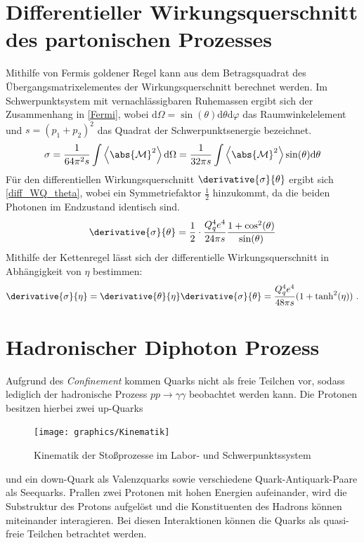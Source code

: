 \section{Differentieller Wirkungsquerschnitt des partonischen Prozesses}
\label{2.2}
Mithilfe von Fermis goldener Regel kann aus dem Betragsquadrat des Übergangsmatrixelementes der Wirkungsquerschnitt berechnet werden.
Im Schwerpunktsystem mit vernachlässigbaren Ruhemassen ergibt sich der Zusammenhang in \textsf{\autoref{Fermi}}, wobei $\text{d}\Omega = \sin(\theta)\text{d}\theta\text{d}\varphi$ das Raumwinkelelement und $s = (p_1 + p_2)^2$ das Quadrat der Schwerpunktsenergie bezeichnet.
\begin{equation}
\sigma = \frac{1}{64\pi^2s} \int \left\langle  \abs{\mathcal{M}}^2\right\rangle \text{d}\Omega = \frac{1}{32\pi s} \int \left\langle  \abs{\mathcal{M}}^2\right\rangle \sin(\theta) \text{d}\theta
\label{Fermi}
\end{equation}
Für den differentiellen Wirkungsquerschnitt $\derivative{\sigma}{\theta}$ ergibt sich \textsf{\autoref{diff_WQ_theta}}, wobei ein Symmetriefaktor $\frac{1}{2}$ hinzukommt, da die beiden Photonen im Endzustand identisch sind.
\begin{equation}
\derivative{\sigma}{\theta} = \frac{1}{2} \cdot \frac{Q_q^4e^4}{24\pi s}\frac{1+\cos^2(\theta)}{\sin(\theta)} 
\label{diff_WQ_theta}
\end{equation}
Mithilfe der Kettenregel lässt sich der differentielle Wirkungsquerschnitt in Abhängigkeit von $\eta$ bestimmen:
\begin{equation}
\derivative{\sigma}{\eta} =\derivative{\theta}{\eta}\derivative{\sigma}{\theta} =  \frac{Q_q^4e^4}{48\pi s}(1+\tanh^2(\eta))~.
\label{diff_WQ_eta}
\end{equation}
\section{Hadronischer Diphoton Prozess}
Aufgrund des \textit{Confinement} kommen Quarks nicht als freie Teilchen vor, sodass lediglich der hadronische Prozess $pp \rightarrow \gamma \gamma$ beobachtet werden kann.  Die Protonen besitzen hierbei zwei up-Quarks
\begin{figure}
	\texttt{[image: graphics/Kinematik]}
	\caption{Kinematik der Stoßprozesse im Labor- und Schwerpunktssystem}
	\label{Kinematik}
\end{figure}
   und ein down-Quark als Valenzquarks sowie verschiedene Quark-Antiquark-Paare als Seequarks. Prallen zwei Protonen mit hohen Energien aufeinander, wird die Substruktur des Protons aufgelöst und die Konstituenten des Hadrons können miteinander interagieren. Bei diesen Interaktionen können die Quarks als quasi-freie Teilchen betrachtet werden.

